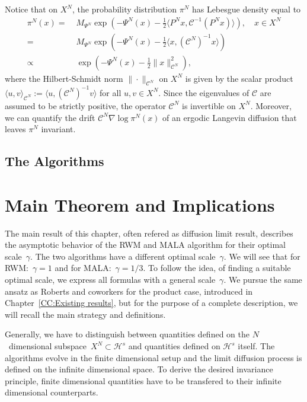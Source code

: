 Notice that on $X^{N}$, the probability distribution $\pi^{N}$ has Lebesgue density equal to
\begin{align}
 \pi^{N}(x) = & \; M_{\Psi^{N}} \exp ( - \Psi^{N}(x) - \tfrac{1}{2} \langle P^{N} x , \mathcal{C}^{-1} ( P^{N} x ) \rangle ), \quad x \in X^{N} \\
 = & \; M_{\Psi^{N}} \exp ( - \Psi^{N}(x) - \tfrac{1}{2} \langle  x , ( \mathcal{C}^{N} )^{-1}  x  \rangle ) \\
 \varpropto & \; \exp ( - \Psi^{N}(x) - \tfrac{1}{2} \|x \|_{\mathcal{C}^{N}}^{2} ),
\end{align}
where the Hilbert-Schmidt norm $ \| \cdot \|_{\mathcal{C}^{N}} $ on $X^{N}$ is given by the scalar product $ \langle u, v \rangle_{\mathcal{C}^{N}} := \langle u, ( \mathcal{C}^{N} )^{-1} v \rangle $ for all $ u,v \in X^{N} $. Since the eigenvalues of $ \mathcal{C} $ are assumed to be strictly positive, the operator $ \mathcal{C}^{N} $ is invertible on $X^{N}$. Moreover, we can quantify the drift $ \mathcal{C}^{N} \nabla \log \pi^{N} (x) $ of an ergodic Langevin diffusion that leaves $ \pi^{N} $ invariant.


\subsection{The Algorithms}
\label{sec:sub:DLR-Algo}

\section{Main Theorem and Implications}
\label{sec:DLR-Main theorem}

The main result of this chapter, often refered as diffusion limit result, describes the asymptotic behavior of the RWM and MALA algorithm for their optimal scale~$\gamma$. The two algorithms have a different optimal scale~$\gamma$. We will see that for RWM:~$\gamma = 1$ and for MALA:~$\gamma = 1/3$. To follow the idea, of finding a suitable optimal scale, we express all formulas with a general scale~$\gamma$. We pursue the same ansatz as Roberts and coworkers for the product case, introduced in Chapter~\ref{CC:Existing results}, but for the purpose of a complete description, we will recall the main strategy and definitions.

Generally, we have to distinguish between quantities defined on the $N$~dimensional subspace~$X^N \subset \mathcal{H}^s$ and quantities defined on $\mathcal{H}^s$ itself. The algorithms evolve in the finite dimensional setup and the limit diffusion process is defined on the infinite dimensional space. To derive the desired invariance principle, finite dimensional quantities have to be transfered to their infinite dimensional counterparts.

